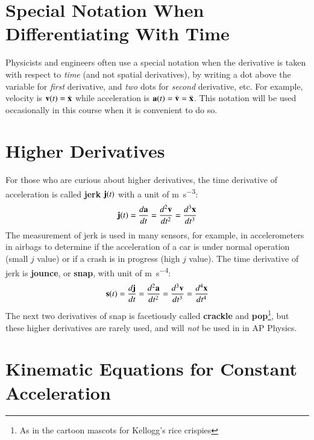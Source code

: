 \documentclass{../../oss-handout}
\newcommand{\mb}[1]{\ensuremath\mathbf{#1}}
\begin{document}
\section{Special Notation When Differentiating With Time}

Physicists and engineers often use a special notation when the derivative is
taken with respect to \emph{time} (and not spatial derivatives), by writing a
dot above the variable for \emph{first} derivative, and \emph{two} dots for
\emph{second} derivative, etc. For example, velocity is
$\mb{v}(t)=\dot{\mb{x}}$ while acceleration is
$\mb{a}(t)= \dot{\mb{v}}=\ddot{\mb{x}}$. This notation will be used occasionally
in this course when it is convenient to do so.


\section{Higher Derivatives}

For those who are curious about higher derivatives, the time derivative of
acceleration is called \textbf{jerk} $\mb{j}(t)$ with a unit of
\si{\metre\per\second^3}:
\begin{equation}
  \mb{j}(t)=\frac{d\mb{a}}{dt}=\frac{d^2\mb{v}}{dt^2}=\frac{d^3\mb{x}}{dt^3}
\end{equation}
The measurement of jerk is used in many sensors, for example, in accelerometers
in airbags to determine if the acceleration of a car is under normal operation
(small $j$ value) or if a crash is in progress (high $j$ value). The time
derivative of jerk is \textbf{jounce}, or \textbf{snap}, with unit of
\si{\metre\per\second^4}:
\begin{equation}
  \mb{s}(t)=\frac{d\mb{j}}{dt}=\frac{d^2\mb{a}}{dt^2}=\frac{d^3\mb{v}}{dt^3}
  =\frac{d^4\mb{x}}{dt^4}
\end{equation}
The next two derivatives of snap is facetiously called \textbf{crackle} and
\textbf{pop}\footnote{As in the cartoon mascots for Kellogg's rice crispies},
but these higher derivatives are rarely used, and will \emph{not} be used in
in AP Physics.



\section{Kinematic Equations for Constant Acceleration}
\end{document}

